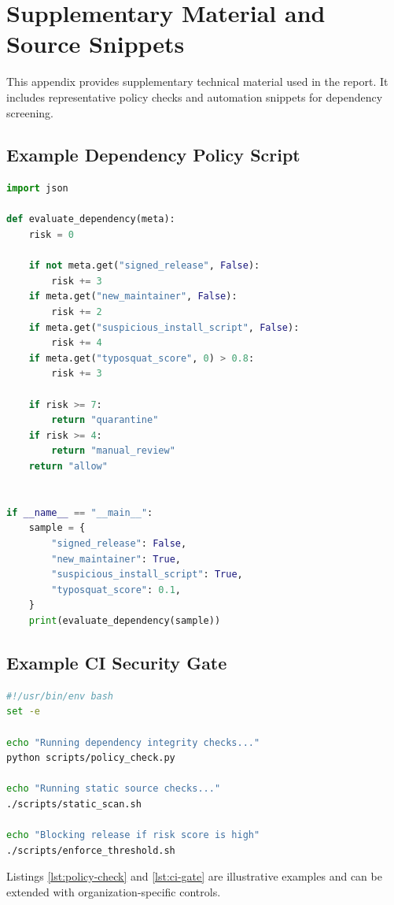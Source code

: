 \appendix
\chapter{Supplementary Material and Source Snippets}
\label{app:supplementary}

This appendix provides supplementary technical material used in the report.
It includes representative policy checks and automation snippets for dependency screening.

\section{Example Dependency Policy Script}

\begin{lstlisting}[language=Python,caption={Illustrative policy checks for dependency metadata.},label={lst:policy-check}]
import json

def evaluate_dependency(meta):
	risk = 0

	if not meta.get("signed_release", False):
		risk += 3
	if meta.get("new_maintainer", False):
		risk += 2
	if meta.get("suspicious_install_script", False):
		risk += 4
	if meta.get("typosquat_score", 0) > 0.8:
		risk += 3

	if risk >= 7:
		return "quarantine"
	if risk >= 4:
		return "manual_review"
	return "allow"


if __name__ == "__main__":
	sample = {
		"signed_release": False,
		"new_maintainer": True,
		"suspicious_install_script": True,
		"typosquat_score": 0.1,
	}
	print(evaluate_dependency(sample))
\end{lstlisting}

\section{Example CI Security Gate}

\begin{lstlisting}[language=bash,caption={Illustrative CI gate for dependency updates.},label={lst:ci-gate}]
#!/usr/bin/env bash
set -e

echo "Running dependency integrity checks..."
python scripts/policy_check.py

echo "Running static source checks..."
./scripts/static_scan.sh

echo "Blocking release if risk score is high"
./scripts/enforce_threshold.sh
\end{lstlisting}

Listings \ref{lst:policy-check} and \ref{lst:ci-gate} are illustrative examples and can be
extended with organization-specific controls.

